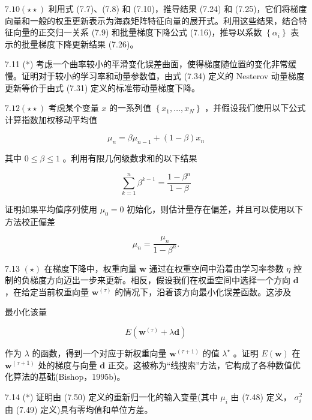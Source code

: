 \documentclass[10pt]{article}
\begin{document}
\({7.10}\left( {\star  \star  }\right)\) 利用式 (7.7)、(7.8) 和 (7.10)，推导结果 (7.24) 和 (7.25)，它们将梯度向量和一般的权重更新表示为海森矩阵特征向量的展开式。利用这些结果，结合特征向量的正交归一关系 (7.9) 和批量梯度下降公式 (7.16)，推导以系数 \(\left\{  {\alpha }_{i}\right\}\) 表示的批量梯度下降更新结果 (7.26)。

7.11 (*) 考虑一个曲率较小的平滑变化误差曲面，使得梯度随位置的变化非常缓慢。证明对于较小的学习率和动量参数值，由式 (7.34) 定义的 Nesterov 动量梯度更新等价于由式 (7.31) 定义的标准带动量梯度下降。

\({7.12}\left( {\star  \star  }\right)\) 考虑某个变量 \(x\) 的一系列值 \(\left\{  {{x}_{1},\ldots ,{x}_{N}}\right\}\) ，并假设我们使用以下公式计算指数加权移动平均值

\[
{\mu }_{n} = \beta {\mu }_{n - 1} + \left( {1 - \beta }\right) {x}_{n} \tag{7.66}
\]

其中 \(0 \leq  \beta  \leq  1\) 。利用有限几何级数求和的以下结果

\[
\mathop{\sum }\limits_{{k = 1}}^{n}{\beta }^{k - 1} = \frac{1 - {\beta }^{n}}{1 - \beta } \tag{7.67}
\]

证明如果平均值序列使用 \({\mu }_{0} = 0\) 初始化，则估计量存在偏差，并且可以使用以下方法校正偏差

\[
{\widehat{\mu }}_{n} = \frac{{\mu }_{n}}{1 - {\beta }^{n}}. \tag{7.68}
\]

7.13 \(\left( \star \right)\) 在梯度下降中，权重向量 \(\mathbf{w}\) 通过在权重空间中沿着由学习率参数 \(\eta\) 控制的负梯度方向迈出一步来更新。相反，假设我们在权重空间中选择一个方向 \(\mathbf{d}\) ，在给定当前权重向量 \({\mathbf{w}}^{\left( \tau \right) }\) 的情况下，沿着该方向最小化误差函数。这涉及

最小化该量

\[
E\left( {{\mathbf{w}}^{\left( \tau \right) } + \lambda \mathbf{d}}\right)  \tag{7.69}
\]

作为 \(\lambda\) 的函数，得到一个对应于新权重向量 \({\mathbf{w}}^{\left( \tau  + 1\right) }\) 的值 \({\lambda }^{ \star  }\) 。证明 \(E\left( \mathbf{w}\right)\) 在 \({\mathbf{w}}^{\left( \tau  + 1\right) }\) 处的梯度与向量 \(\mathbf{d}\) 正交。这被称为“线搜索”方法，它构成了各种数值优化算法的基础(Bishop，1995b)。

7.14 (*) 证明由 (7.50) 定义的重新归一化的输入变量(其中 \({\mu }_{i}\) 由 (7.48) 定义， \({\sigma }_{i}^{2}\) 由 (7.49) 定义)具有零均值和单位方差。
\end{document}
